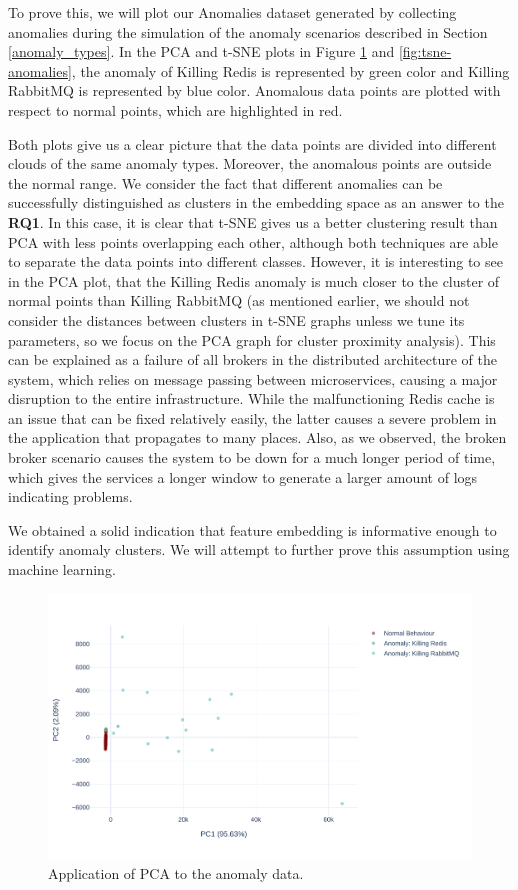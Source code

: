 To prove this, we will plot our Anomalies dataset generated by collecting anomalies during the simulation of the anomaly scenarios described in Section \ref{anomaly_types}. In the PCA and t-SNE plots in Figure \ref{fig:pca-anomalies} and \ref{fig:tsne-anomalies}, the anomaly of Killing Redis is represented by green color and Killing RabbitMQ is represented by blue color. Anomalous data points are plotted with respect to normal points, which are highlighted in red. 

Both plots give us a clear picture that the data points are divided into different clouds of the same anomaly types. Moreover, the anomalous points are outside the normal range. We consider the fact that different anomalies can be successfully distinguished as clusters in the embedding space as an answer to the \textbf{RQ1}. In this case, it is clear that t-SNE gives us a better clustering result than PCA with less points overlapping each other, although both techniques are able to separate the data points into different classes. However, it is interesting to see in the PCA plot, that the Killing Redis anomaly is much closer to the cluster of normal points than Killing RabbitMQ (as mentioned earlier, we should not consider the distances between clusters in t-SNE graphs unless we tune its parameters, so we focus on the PCA graph for cluster proximity analysis). This can be explained as a failure of all brokers in the distributed architecture of the system, which relies on message passing between microservices, causing a major disruption to the entire infrastructure. 
While the malfunctioning Redis cache is an issue that can be fixed relatively easily, the latter causes a severe problem in the application that propagates to many places. Also, as we observed, the broken broker scenario causes the system to be down for a much longer period of time, which gives the services a longer window to generate a larger amount of logs indicating problems.

We obtained a solid indication that feature embedding is informative enough to identify anomaly clusters. We will attempt to further prove this assumption using machine learning.

\begin{figure}[!h]
    \centering
    \includegraphics[width=\textwidth]{img/pca-anomalies-vs-normal.pdf}
    \caption{Application of PCA to the anomaly data.}
    \label{fig:pca-anomalies}
\end{figure}

